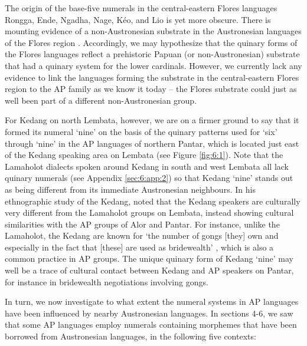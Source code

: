 The origin of the base-five numerals in the central-eastern Flores languages Rongga, Ende, Ngadha, Nage, K\'eo, and Lio is yet more obscure. There is mounting evidence of a non-Austronesian substrate in the Austronesian languages of the Flores region \citep[see, e.g.,][]{Capell1976,Klamer2012}. Accordingly, we may hypothesize that the quinary forms of the Flores languages reflect a prehistoric Papuan (or non-Austronesian) substrate that had a quinary system for the lower cardinals. However, we currently lack any evidence to link the languages forming the substrate in the central-eastern Flores region to the AP family as we know it today -- the Flores substrate could just as well been part of a different non-Austronesian group. 

For Kedang on north Lembata, however, we are on a firmer ground to say that it formed its numeral `nine' on the basis of the quinary patterns used for `six' through `nine' in the AP languages of northern Pantar, which is located just east of the Kedang speaking area on Lembata (see Figure \ref{fig:6:1}). Note that the Lamaholot dialects spoken around Kedang in south and west Lembata all lack quinary numerals (see Appendix \ref{sec:6:app:2}) so that Kedang `nine' stands out as being different from its immediate Austronesian neighbours. In his ethnographic study of the Kedang, \citet{Barnes1974} noted that the Kedang speakers are culturally very different from the Lamaholot groups on Lembata, instead showing cultural similarities with the AP groups of Alor and Pantar. For instance, unlike the Lamaholot, the Kedang are known for `the number of gongs [they] own and especially in the fact that [these] are used as bridewealth' \citep[15]{Barnes1974}, which is also a common practice in AP groups. The unique quinary form of Kedang `nine' may well be a trace of cultural contact between Kedang and AP speakers on Pantar, for instance in bridewealth negotiations involving gongs. 

In turn, we now investigate to what extent the numeral systems in AP languages have been influenced by nearby Austronesian languages. In sections 4-6, we saw that some AP languages employ numerals containing morphemes that have been borrowed from Austronesian languages, in the following five contexts: 


